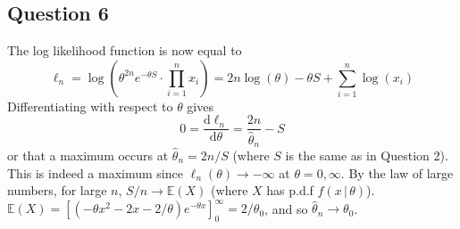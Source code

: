 \documentclass[10pt,a4paper,notitlepage]{article}
\newcommand{\E}[1]{\mathbb{E}\left(#1\right)}
\begin{document}
\subsection*{\centering Question 6}
The log likelihood function is now equal to
\begin{equation}\label{eq:LLFConcave}
\ell_{n}=\log\left( \theta^{2n}e^{-\theta S}\cdot\prod_{i=1}^{n}x_{i}\right)=2n\log(\theta)-\theta S+\sum_{i=1}^{n}\log(x_{i})
\end{equation}
Differentiating with respect to $\theta$ gives
\begin{equation}
0 = \frac{\mathrm{d}\ell_{n}}{\mathrm{d}\theta}=\frac{2n}{\widehat{\theta}_{n}}-S
\end{equation}
or that a maximum occurs at $\widehat{\theta}_{n} = 2n/S$ (where $S$ is the same as in Question 2). This is indeed a maximum since $\ell_{n}\left(\theta\right)\rightarrow -\infty$ at $\theta=0,\infty$. By the law of large numbers, for large $n$, $S/n\rightarrow \E{X}$ (where $X$ has p.d.f $f(x\, |\, \theta)$). $\E{X}=\left[ (-\theta x^{2}-2x-2/\theta)e^{-\theta x}\right]_{0}^{\infty}=2/\theta_{0}$, and so $\widehat{\theta}_{n}\rightarrow \theta_{0}$.
\end{document}
